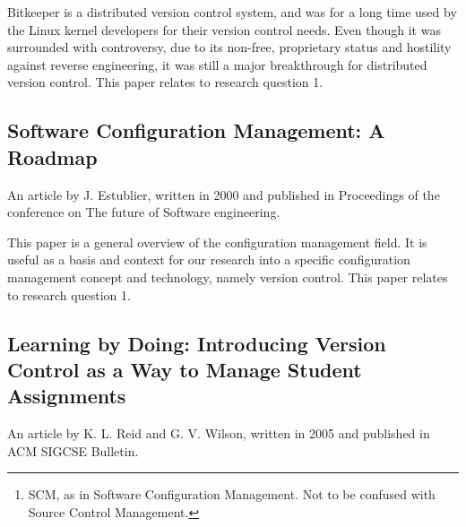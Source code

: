 \documentclass{llncs}
\begin{document}
Bitkeeper is a distributed version control system, and was for a long
time used by the Linux kernel developers for their version control
needs. Even though it was surrounded with controversy, due to its
non-free, proprietary status and hostility against reverse
engineering, it was still a major breakthrough for distributed version
control. This paper relates to research question 1.

\subsection{Software Configuration Management: A Roadmap}

An article by J. Estublier, written in 2000 and published in Proceedings of
the conference on The future of Software engineering.

\begin{abstract}
 This paper, in the first chapter summarizes the state of the art in
 SCM\footnote{
  SCM, as in Software Configuration Management. Not to be confused with
  Source Control Management.
 }, showing the evolution along the last 25 years. Chapter 2 shows the
 current research work under way in the area. In chapter 3, the challenges
 SCM has to take up, as well as SCM future research are discussed.
\end{abstract}

This paper is a general overview of the configuration management
field. It is useful as a basis and context for our research into a
specific configuration management concept and technology, namely
version control. This paper relates to research question 1.

\subsection{Learning by Doing: Introducing Version Control as a Way to
               Manage Student Assignments}

An article by K. L. Reid and G. V. Wilson, written in 2005 and published in
ACM SIGCSE Bulletin.

\begin{abstract}
 Professional software developers use version control systems to coordinate
 their work, and to provide an unwindable history of their project's
 evolution. In contrast, students in most programming courses use a
 homegrown electronic submission program to submit their work, and email to
 coordinate with partners when doing team projects. In May 2003, we began
 using CVS, a popular open source version control system, as an assignment
 submission system. Students receive starter code by checking out each
 student's repository, and committing the marks. Our experience to date
 shows that this is both a simpler and more flexible way to manage student
 assignments, and also an excellent way to teach them how to use a
 fundamental software development tool.
\end{abstract}
\end{document}
